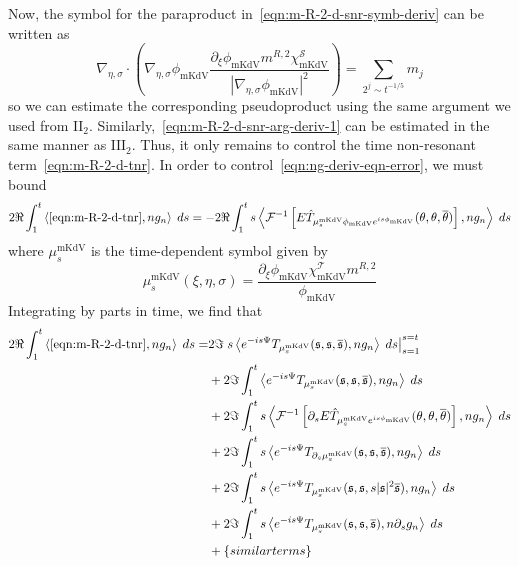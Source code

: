 \documentclass[letterpaper, reqno,final]{amsart}
\newcommand{\cT}{\mathcal{T}}
\newcommand{\fs}{\mathfrak{s}}
\newcommand{\rmII}{\mathrm{II}}
\newcommand{\rmIII}{\mathrm{III}}
\newcommand{\deles}{\nabla_{\eta,\sigma}}
\newcommand{\tmkdv}{\text{mKdV}}
\newcommand{\phimKdV}{\phi_{\tmkdv}}
\newcommand{\btext}[1]{\left\{\textup{#1}\right\}}
\newcommand{\bsim}{\btext{similar terms}}
\begin{document}
Now, the symbol for the paraproduct in~\eqref{eqn:m-R-2-d-snr-symb-deriv} can be written as
\begin{equation*}
    \deles \cdot \left(\deles \phi_{\tmkdv} \frac{\partial_\xi \phi_\tmkdv m^{R,2} \chi^\mathcal{S}_\tmkdv}{|\deles \phi_{\tmkdv}|^2}\right) = \sum_{2^j \sim t^{-1/5}} m_j
\end{equation*}
so we can estimate the corresponding pseudoproduct using the same argument we used from $\rmII_2$. Similarly,~\eqref{eqn:m-R-2-d-snr-arg-deriv-1} can be estimated in the same manner as $\rmIII_2$.  Thus, it only remains to control the time non-resonant term~\eqref{eqn:m-R-2-d-tnr}.  In order to control~\eqref{eqn:ng-deriv-eqn-error}, we must bound
\begin{equation*}
    2 \Re \int_1^t \left\langle \eqref{eqn:m-R-2-d-tnr}, ng_n \right\rangle\;ds = -2\Re \int_{1}^t s \left\langle \mathcal{F}^{-1} \left[ E \hat{T}_{\mu_s^\tmkdv\phimKdV e^{is\phimKdV}}(\theta, \theta, \overline{\theta})\right], n g_n \right\rangle\;ds
\end{equation*}
where $\mu_s^\tmkdv$ is the time-dependent symbol given by
\begin{equation*}
    \mu_s^\tmkdv(\xi,\eta,\sigma) = \frac{\partial_\xi \phimKdV \chi^\cT_{\tmkdv} m^{R,2}}{\phimKdV}
\end{equation*} 
Integrating by parts in time, we find that
\begin{subequations}\begin{align}
    2 \Re \int_1^t \left\langle \eqref{eqn:m-R-2-d-tnr}, ng_n \right\rangle\;ds =& 2\Im \left. s\left\langle e^{-is\Psi} T_{\mu_s^\tmkdv}(\fs, \fs, \overline{\fs}) , n g_n\right\rangle\;ds\right|_{s = 1}^{s = t}\label{eqn:m-R-2-d-tnr-a}\\
    &+ 2\Im \int_1^t \left\langle e^{-is\Psi} T_{\mu_s^\tmkdv}(\fs, \fs, \overline{\fs}) , n g_n\right\rangle\;ds\label{eqn:m-R-2-d-tnr-b}\\
    &+ 2\Im \int_1^t s\left\langle \mathcal{F}^{-1}\left[\partial_s E \hat{T}_{\mu_s^\tmkdv e^{is\phimKdV}}(\theta, \theta, \overline{\theta}) \right], n g_n\right\rangle\;ds\label{eqn:m-R-2-d-tnr-c}\\
    &+ 2\Im \int_1^t s\left\langle e^{-is\Psi} T_{\partial_s\mu_s^\tmkdv }(\fs, \fs, \overline{\fs}) , n g_n\right\rangle\;ds\label{eqn:m-R-2-d-tnr-d}\\
    &+ 2\Im \int_1^t s\left\langle e^{-is\Psi} T_{\mu_s^\tmkdv}(\fs, \fs, s|\fs|^2\overline{\fs}), n g_n\right\rangle\;ds\label{eqn:m-R-2-d-tnr-e}\\
    &+ 2\Im \int_1^t s\left\langle e^{-is\Psi} T _{\mu_s^\tmkdv}(\fs, \fs,  \overline{\fs}), n \partial_s g_n\right\rangle\;ds\label{eqn:m-R-2-d-tnr-f}\\
    &+ \bsim\notag
\end{align}\end{subequations}
\end{document}
